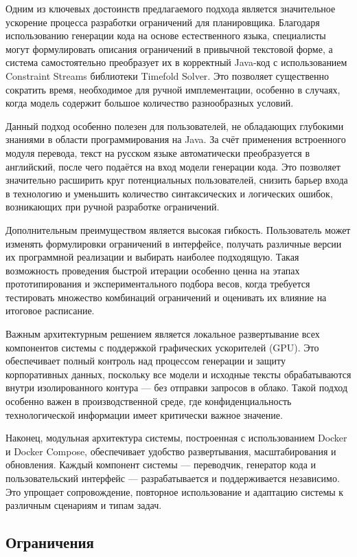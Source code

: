 Одним из ключевых достоинств предлагаемого подхода является значительное ускорение процесса разработки ограничений для планировщика. Благодаря использованию генерации кода на основе естественного языка, специалисты могут формулировать описания ограничений в привычной текстовой форме, а система самостоятельно преобразует их в корректный Java-код с использованием Constraint Streams библиотеки Timefold Solver. Это позволяет существенно сократить время, необходимое для ручной имплементации, особенно в случаях, когда модель содержит большое количество разнообразных условий.

Данный подход особенно полезен для пользователей, не обладающих глубокими знаниями в области программирования на Java. За счёт применения встроенного модуля перевода, текст на русском языке автоматически преобразуется в английский, после чего подаётся на вход модели генерации кода. Это позволяет значительно расширить круг потенциальных пользователей, снизить барьер входа в технологию и уменьшить количество синтаксических и логических ошибок, возникающих при ручной разработке ограничений.

Дополнительным преимуществом является высокая гибкость. Пользователь может изменять формулировки ограничений в интерфейсе, получать различные версии их программной реализации и выбирать наиболее подходящую. Такая возможность проведения быстрой итерации особенно ценна на этапах прототипирования и экспериментального подбора весов, когда требуется тестировать множество комбинаций ограничений и оценивать их влияние на итоговое расписание.

Важным архитектурным решением является локальное развертывание всех компонентов системы с поддержкой графических ускорителей (GPU). Это обеспечивает полный контроль над процессом генерации и защиту корпоративных данных, поскольку все модели и исходные тексты обрабатываются внутри изолированного контура — без отправки запросов в облако. Такой подход особенно важен в производственной среде, где конфиденциальность технологической информации имеет критически важное значение.

Наконец, модульная архитектура системы, построенная с использованием Docker и Docker Compose, обеспечивает удобство развертывания, масштабирования и обновления. Каждый компонент системы — переводчик, генератор кода и пользовательский интерфейс — разрабатывается и поддерживается независимо. Это упрощает сопровождение, повторное использование и адаптацию системы к различным сценариям и типам задач.

\subsection{Ограничения}

